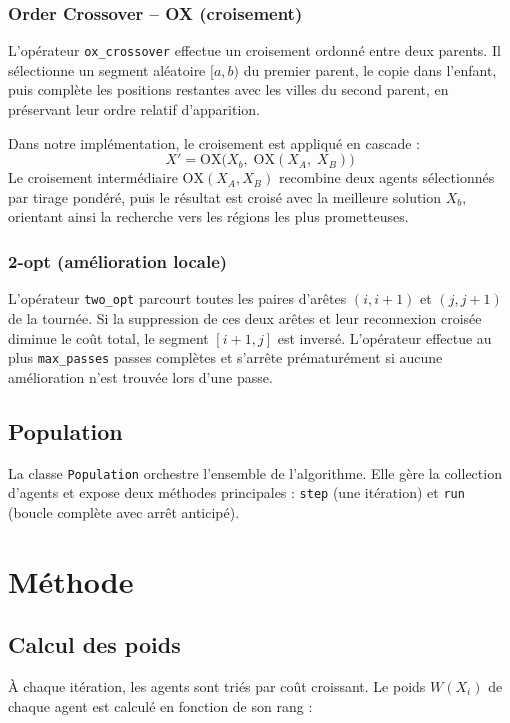 \documentclass[12pt,a4paper]{report}
\begin{document}
\subsection{Order Crossover -- OX (croisement)}
L'opérateur \texttt{ox\_crossover} effectue un croisement ordonné entre
deux parents. Il sélectionne un segment aléatoire $[a, b)$ du premier
parent, le copie dans l'enfant, puis complète les positions restantes
avec les villes du second parent, en préservant leur ordre relatif
d'apparition.

Dans notre implémentation, le croisement est appliqué en cascade :
\begin{equation}
	X' = \text{OX}\bigl(X_b,\; \text{OX}(X_A,\; X_B)\bigr)
\end{equation}
Le croisement intermédiaire $\text{OX}(X_A, X_B)$ recombine deux agents
sélectionnés par tirage pondéré, puis le résultat est croisé avec la
meilleure solution $X_b$, orientant ainsi la recherche vers les régions
les plus prometteuses.

\subsection{2-opt (amélioration locale)}
L'opérateur \texttt{two\_opt} parcourt toutes les paires d'arêtes
$(i, i{+}1)$ et $(j, j{+}1)$ de la tournée. Si la suppression de ces
deux arêtes et leur reconnexion croisée diminue le coût total, le
segment $[i{+}1, j]$ est inversé. L'opérateur effectue au plus
\texttt{max\_passes} passes complètes et s'arrête prématurément si
aucune amélioration n'est trouvée lors d'une passe.

\section{Population}
La classe \texttt{Population} orchestre l'ensemble de l'algorithme. Elle
gère la collection d'agents et expose deux méthodes principales :
\texttt{step} (une itération) et \texttt{run} (boucle complète avec
arrêt anticipé).

\chapter{Méthode}

\section{Calcul des poids}
À chaque itération, les agents sont triés par coût croissant. Le poids
$W(X_i)$ de chaque agent est calculé en fonction de son rang :
\end{document}
